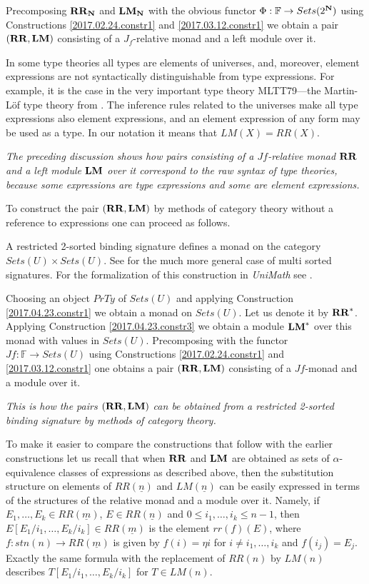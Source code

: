 \documentclass[12pt]{amsart}
\newcommand{\sr}{\rightarrow}
\newcommand{\nn}{{\bf N\rm}}
\newcommand{\nat}{\nn}
\newcommand{\uu}{\underline}
\newcommand{\RR}{{\bf RR}}
\newcommand{\LM}{{\bf LM}}
\newcommand{\FF}{{\mathbb F}}
\newcommand{\ff}[1]{\uu{#1}}
\begin{document}
Precomposing $\RR_{\nat}$ and $\LM_{\nat}$ with the obvious functor
$\Phi:\FF\sr Sets(2^{\nat})$ using Constructions \ref{2017.02.24.constr1} and
\ref{2017.03.12.constr1} we obtain a pair $(\RR,\LM)$ consisting of a $J_f$-relative monad
and a left module over it.

In some type theories all types are elements of universes, and, moreover, element
expressions are not syntactically distinguishable from type expressions. For
example, it is the case in the very important type theory MLTT79---the
Martin-L\"{o}f type theory from \cite{MLTT79}. The inference rules related to
the universes \cite[p.~172]{MLTT79} make all type expressions also element
expressions, and an element expression of any form may be used as a type. In our
notation it means that $LM(X)=RR(X)$.

{\em The preceding discussion shows how pairs consisting of a $Jf$-relative monad $\RR$
  and a left module $\LM$ over it correspond to the raw syntax of type theories,
  because some expressions are type expressions and some are element
  expressions.}

To construct the pair $(\RR,\LM)$ by methods of category theory without a
reference to expressions one can proceed as follows.

A restricted 2-sorted binding signature defines a monad on the category
$Sets(U)\times Sets(U)$. See \cite{Zsido} for the much more general case of multi
sorted signatures. For the formalization of this construction in {\em UniMath} see
\cite{AMM2017}.

Choosing an object $PrTy$ of $Sets(U)$ and applying Construction
\ref{2017.04.23.constr1} we obtain a monad on $Sets(U)$. Let us denote it by
$\RR^*$. Applying Construction \ref{2017.04.23.constr3} we obtain a module
$\LM^*$ over this monad with values in $Sets(U)$.  Precomposing with the
functor $Jf:\FF\sr Sets(U)$ using Constructions \ref{2017.02.24.constr1} and
\ref{2017.03.12.constr1} one obtains a pair $(\RR,\LM)$ consisting of a $Jf$-monad and a
module over it.

{\em This is how the pairs $(\RR,\LM)$ can be obtained from a restricted
  2-sorted binding signature by methods of category theory.}

To make it easier to compare the constructions that follow with the earlier
constructions let us recall that when $\RR$ and $\LM$ are obtained as sets
of $\alpha$-equivalence classes of expressions as described above, then the
substitution structure on elements of $RR(\ff{n})$ and $LM(\ff{n})$ can be
easily expressed in terms of the structures of the relative monad and a module
over it.  Namely, if $E_1,\dots,E_k\in RR(\ff{m})$, 
$E\in RR(\ff{n})$ and $0\le i_1,\dots,i_k\le n-1$, then 
$E[E_1/i_1,\dots,E_k/i_k]\in RR(\ff{m})$ is the element $rr(f)(E)$, where $f:stn(n)\sr RR(\ff{m})$ is given
by $f(i)=\eta{i}$ for $i\ne i_1,\dots,i_k$ and $f(i_j)=E_j$. Exactly the same
formula with the replacement of $RR(n)$ by $LM(n)$ describes
$T[E_1/i_1,\dots,E_k/i_k]$ for $T\in LM(n)$.
\end{document}
